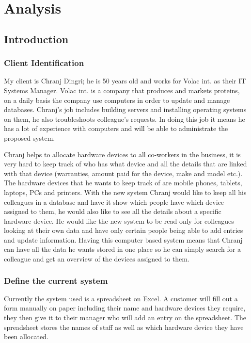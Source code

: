 \chapter{Analysis}

\section{Introduction}

\subsection{Client Identification}

My client is Chranj Dingri; he is 50 years old and works for Volac int. as their IT Systems Manager. Volac int. is a company that produces and markets proteins, on a daily basis the company use computers in order to update and manage databases. Chranj's job includes building servers and installing operating systems on them, he also troubleshoots colleague's requests. In doing this job it means he has a lot of experience with computers and will be able to administrate the proposed system.


Chranj helps to allocate hardware devices to all co-workers in the business, it is very hard to keep track of who has what device and all the details that are linked with that device (warranties, amount paid for the device, make and model etc.). The hardware devices that he wants to keep track of are mobile phones, tablets, laptops, PCs and printers. With the new system Chranj would like to keep all his colleagues in a database and have it show which people have which device assigned to them, he would also like to see all the details about a specific hardware device. He would like the new system to be read only for colleagues looking at their own data and have only certain people being able to add entries and update information. Having this computer based system means that Chranj can have all the data he wants stored in one place so he can simply search for a colleague and get an overview of the devices assigned to them. 

\subsection{Define the current system}

Currently the system used is a spreadsheet on Excel. A customer will fill out a form manually on paper including their name and hardware devices they require, they then give it to their manager who will add an entry on the spreadsheet.  The spreadsheet stores the names of staff as well as which hardware device they have been allocated.

